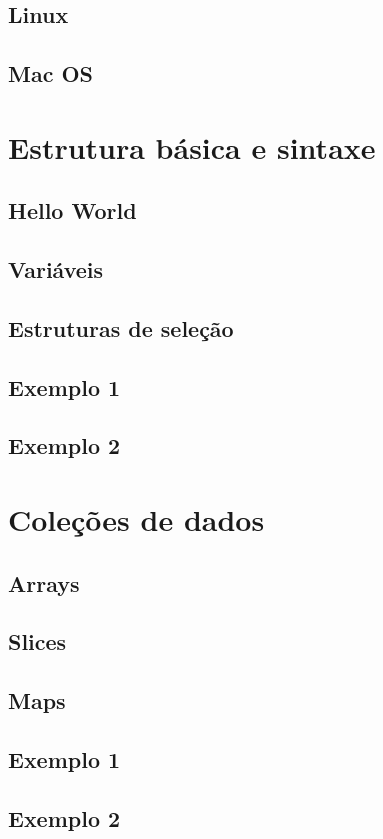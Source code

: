\documentclass{SBCbookchapter}
\begin{document}
\subsection{Linux}
\subsection{Mac OS}

\section{Estrutura básica e sintaxe}
\subsection{Hello World}
\subsection{Variáveis}
\subsection{Estruturas de seleção}
\subsection{Exemplo 1}
\subsection{Exemplo 2}

\section{Coleções de dados}
\subsection{Arrays}
\subsection{Slices}
\subsection{Maps}
\subsection{Exemplo 1}
\subsection{Exemplo 2}
\end{document}
